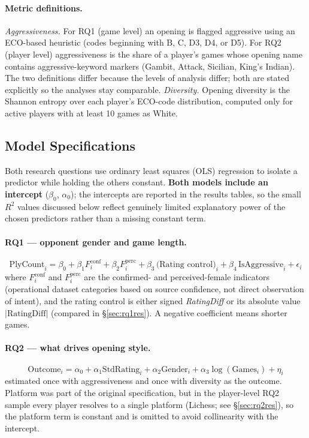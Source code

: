 \documentclass[11pt,a4paper]{article}
\begin{document}
\paragraph{Metric definitions.}
\emph{Aggressiveness.} For RQ1 (game level) an opening is flagged aggressive using an
ECO-based heuristic (codes beginning with B, C, D3, D4, or D5). For RQ2 (player level)
aggressiveness is the share of a player's games whose opening name contains
aggressive-keyword markers (Gambit, Attack, Sicilian, King's Indian). The two definitions
differ because the levels of analysis differ; both are stated explicitly so the analyses stay
comparable. \emph{Diversity.} Opening diversity is the Shannon entropy over each player's
ECO-code distribution, computed only for active players with at least 10 games as White.

\subsection{Model Specifications}
Both research questions use ordinary least squares (OLS) regression to isolate a predictor
while holding the others constant. \textbf{Both models include an intercept} ($\beta_0$,
$\alpha_0$); the intercepts are reported in the results tables, so the small $R^2$ values
discussed below reflect genuinely limited explanatory power of the chosen predictors rather
than a missing constant term.

\paragraph{RQ1 --- opponent gender and game length.}
\begin{equation}
\text{PlyCount}_i = \beta_0 + \beta_1 F^{\text{conf}}_i + \beta_2 F^{\text{perc}}_i
+ \beta_3\,\text{(Rating control)}_i + \beta_4\,\text{IsAggressive}_i + \epsilon_i
\label{eq:rq1}
\end{equation}
where $F^{\text{conf}}_i$ and $F^{\text{perc}}_i$ are the confirmed- and perceived-female
indicators (operational dataset categories based on source confidence, not direct
observation of intent), and the rating control is either signed \textit{RatingDiff} or its
absolute value $|\text{RatingDiff}|$ (compared in \S\ref{sec:rq1res}). A negative coefficient
means shorter games.

\paragraph{RQ2 --- what drives opening style.}
\begin{equation}
\text{Outcome}_i = \alpha_0 + \alpha_1 \text{StdRating}_i + \alpha_2 \text{Gender}_i
+ \alpha_3 \log(\text{Games}_i) + \eta_i
\label{eq:rq2}
\end{equation}
estimated once with aggressiveness and once with diversity as the outcome. Platform was part
of the original specification, but in the player-level RQ2 sample every player resolves to a
single platform (Lichess; see \S\ref{sec:rq2res}), so the platform term is constant and is
omitted to avoid collinearity with the intercept.
\end{document}
